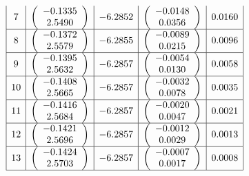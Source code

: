 \documentclass[14pt,a4paper]{extarticle}
\theoremstyle{definition}
\renewcommand{\[}{\begin{dmath*}[compact]}
\renewcommand{\]}{\end{dmath*}}
\begin{document}
\[\begin{array}{*5{|c}|}
   7 & \left(\begin{array}{c}   -0.1335\\    2.5490\end{array}\right) &    -6.2852 & \left(\begin{array}{c}   -0.0148\\    0.0356\end{array}\right) &     0.0160 \\\hline
   8 & \left(\begin{array}{c}   -0.1372\\    2.5579\end{array}\right) &    -6.2855 & \left(\begin{array}{c}   -0.0089\\    0.0215\end{array}\right) &     0.0096 \\\hline
   9 & \left(\begin{array}{c}   -0.1395\\    2.5632\end{array}\right) &    -6.2857 & \left(\begin{array}{c}   -0.0054\\    0.0130\end{array}\right) &     0.0058 \\\hline
  10 & \left(\begin{array}{c}   -0.1408\\    2.5665\end{array}\right) &    -6.2857 & \left(\begin{array}{c}   -0.0032\\    0.0078\end{array}\right) &     0.0035 \\\hline
  11 & \left(\begin{array}{c}   -0.1416\\    2.5684\end{array}\right) &    -6.2857 & \left(\begin{array}{c}   -0.0020\\    0.0047\end{array}\right) &     0.0021 \\\hline
  12 & \left(\begin{array}{c}   -0.1421\\    2.5696\end{array}\right) &    -6.2857 & \left(\begin{array}{c}   -0.0012\\    0.0029\end{array}\right) &     0.0013 \\\hline
  13 & \left(\begin{array}{c}   -0.1424\\    2.5703\end{array}\right) &    -6.2857 & \left(\begin{array}{c}   -0.0007\\    0.0017\end{array}\right) &     0.0008 \\\hline
\end{array}\]
\end{document}
